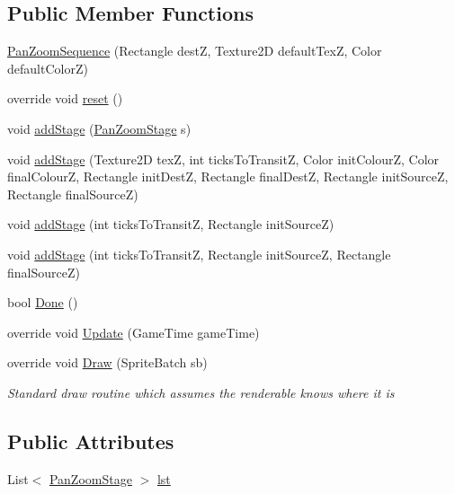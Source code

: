 \subsection*{Public Member Functions}
\begin{DoxyCompactItemize}
\item 
\mbox{\hyperlink{class_r_c___framework_1_1_pan_zoom_sequence_acf6051001df62fee79c67a3e53012341}{Pan\+Zoom\+Sequence}} (Rectangle destZ, Texture2D default\+TexZ, Color default\+ColorZ)
\item 
override void \mbox{\hyperlink{class_r_c___framework_1_1_pan_zoom_sequence_ab235ec7298062b4e3a028979c5abad5c}{reset}} ()
\item 
void \mbox{\hyperlink{class_r_c___framework_1_1_pan_zoom_sequence_a6e2a1cbdd12386dd59daab6ab1bb94fc}{add\+Stage}} (\mbox{\hyperlink{class_r_c___framework_1_1_pan_zoom_stage}{Pan\+Zoom\+Stage}} s)
\item 
void \mbox{\hyperlink{class_r_c___framework_1_1_pan_zoom_sequence_a35676939d35ab90a9a8c855a9fcf4479}{add\+Stage}} (Texture2D texZ, int ticks\+To\+TransitZ, Color init\+ColourZ, Color final\+ColourZ, Rectangle init\+DestZ, Rectangle final\+DestZ, Rectangle init\+SourceZ, Rectangle final\+SourceZ)
\item 
void \mbox{\hyperlink{class_r_c___framework_1_1_pan_zoom_sequence_ac8daade410a23e40a6050b0152d28cf9}{add\+Stage}} (int ticks\+To\+TransitZ, Rectangle init\+SourceZ)
\item 
void \mbox{\hyperlink{class_r_c___framework_1_1_pan_zoom_sequence_a5ac14ab5b1b52c28349481afb6f4b8b5}{add\+Stage}} (int ticks\+To\+TransitZ, Rectangle init\+SourceZ, Rectangle final\+SourceZ)
\item 
bool \mbox{\hyperlink{class_r_c___framework_1_1_pan_zoom_sequence_a7e24734bce4072f60e65cc1b63ca460c}{Done}} ()
\item 
override void \mbox{\hyperlink{class_r_c___framework_1_1_pan_zoom_sequence_a1c15ccaf96c79adece0f665f1419f95b}{Update}} (Game\+Time game\+Time)
\item 
override void \mbox{\hyperlink{class_r_c___framework_1_1_pan_zoom_sequence_a63516b58108ff5f5bcb03d24230128f3}{Draw}} (Sprite\+Batch sb)
\begin{DoxyCompactList}\small\item\em Standard draw routine which assumes the renderable knows where it is \end{DoxyCompactList}\end{DoxyCompactItemize}
\subsection*{Public Attributes}
\begin{DoxyCompactItemize}
\item 
List$<$ \mbox{\hyperlink{class_r_c___framework_1_1_pan_zoom_stage}{Pan\+Zoom\+Stage}} $>$ \mbox{\hyperlink{class_r_c___framework_1_1_pan_zoom_sequence_ae20aeed249f040a8f132657fae2087ec}{lst}}
\end{DoxyCompactItemize}
